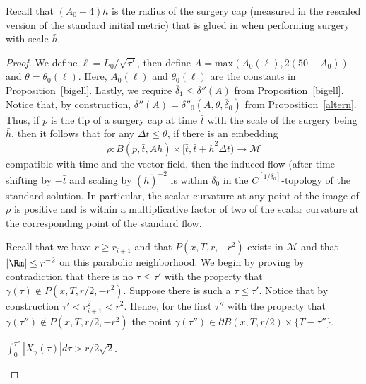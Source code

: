 \begin{remark}
\label{rem:surgery-cap-radius-recollection}
Recall that $(A_0+4)\bar h$ is the radius of the surgery cap (measured in the
rescaled version of the standard initial metric) that is glued in when
performing surgery with scale $\bar h$.
\end{remark}






\begin{proof}
We define $\ell=L_0/\sqrt{\tau'}$, then define $A=\mathrm{max}(A_0(\ell),2(50+A_0))$ and $\theta=\theta_0(\ell)$. Here,
$A_0(\ell)$ and $\theta_0(\ell)$ are the constants in
Proposition~\ref{bigell}.
  Lastly, we require $\overline\delta_1\le \delta''(A)$ from
Proposition~\ref{bigell}. Notice that, by construction,
 $\delta''(A)=\delta''_0(A,\theta,\overline\delta_0)$ from
Proposition~\ref{altern}. Thus, if $p$ is the tip of a surgery cap at time $\bar t$
with the scale of the surgery being $\bar h$, then it follows that
for any $\Delta t\le \theta$, if there is an embedding
$$\rho\colon B(p,\bar t,A\bar h)\times [\bar t,\bar t+\bar h^2\Delta t)\to {\mathcal M}$$
 compatible with time and the vector field, then the induced flow (after time shifting by $-\bar t$
 and scaling by $(\bar h)^{-2}$ is within $\overline\delta_0$ in the
 $C^{[1/\overline\delta_0]}$-topology of the standard solution.
 In particular, the scalar curvature
at any point of the image of $\rho$  is positive and is within a
multiplicative factor of two of the scalar curvature at the
corresponding point of the standard flow.

 Recall that we have $r\ge r_{i+1}$ and
that $P(x,T,r,-r^2)$ exists in ${\mathcal M}$ and that $|\Rm|\le
r^{-2}$ on this parabolic neighborhood.  We begin by proving by
contradiction that there is no $\tau\le  \tau'$ with the property
that $\gamma(\tau)\not\in P(x,T,r/2,-r^2)$. Suppose there is such a
$\tau\le \tau'$. Notice that by construction
$\tau'<r_{i+1}^2<r^2$. Hence,  for the first $\tau''$ with the
property that $\gamma(\tau'')\not\in P(x,T,r/2,-r^2)$ the point
$\gamma(\tau'')\in
\partial B(x,T,r/2)\times \{T-\tau''\}$.

\begin{claim}
\label{claim:energy-lower-bound-exit-ball}
$\int_0^{\tau''}|X_\gamma(\tau)|d\tau> r/2\sqrt{2}$.
\end{claim}


\end{proof}
